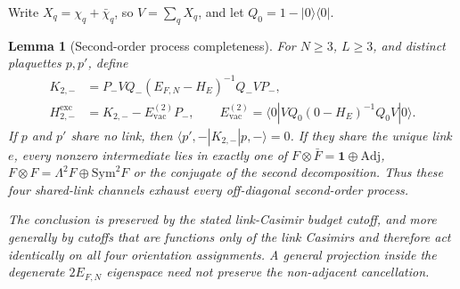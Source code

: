 \documentclass[11pt]{article}
\theoremstyle{plain}
\newtheorem{lemma}[theorem]{Lemma}
\theoremstyle{definition}
\theoremstyle{remark}
\begin{document}
Write $X_q=\chi_q+\bar\chi_q$, so $V=\sum_q X_q$, and let
$Q_0=1-|0\rangle\langle0|$.

\begin{lemma}[Second-order process completeness]\label{lem:exhaust}\label{lem:process-complete}
For $N\ge3$, $L\ge3$, and distinct plaquettes $p,p'$, define
\begin{align}
  K_{2,-}&=P_-VQ_-(E_{F,N}-H_E)^{-1}Q_-VP_- ,\label{eq:K2}\\
  H^{\mathrm{exc}}_{2,-}&=K_{2,-}-E^{(2)}_{\mathrm{vac}}P_-,\qquad
  E^{(2)}_{\mathrm{vac}}=\langle0|VQ_0(0-H_E)^{-1}Q_0V|0\rangle .\label{eq:K2exc}
\end{align}
If $p$ and $p'$ share no link, then $\langle p',-|K_{2,-}|p,-\rangle=0$. If
they share the unique link $e$, every nonzero intermediate lies in exactly one
of $F\otimes\bar F=\mathbf1\oplus\mathrm{Adj}$,
$F\otimes F=\Lambda^2F\oplus\mathrm{Sym}^2F$ or the conjugate of the second
decomposition. Thus these four shared-link channels exhaust every
off-diagonal second-order process.

The conclusion is preserved by the stated link-Casimir budget cutoff, and more
generally by cutoffs that are functions only of the link Casimirs and
therefore act identically on all four orientation assignments. A general
projection inside the degenerate $2E_{F,N}$ eigenspace need not preserve the
non-adjacent cancellation.
\end{lemma}
\end{document}
